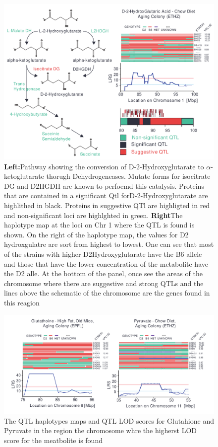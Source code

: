 \documentclass[a4paper,11pt,twoside]{book}
\begin{document}
	\begin{figure}
		\includegraphics[width=1.2\linewidth]{QTL_Results/D2HG_QTL.pdf}
		\caption{\textbf{Left:}Pathway showing the conversion of D-2-Hydroxyglutarate to $\alpha$-ketoglutarate thorugh Dehydrogeneases. Mutate forms for isocitrate DG and D2HGDH are known to perfoemd this catalysis. Proteins that are contained in a significant Qtl forD-2-Hydroxyglutarate are highlithed in black. Proteins in suggestive QTl are highligted in red and non-significant loci are highlghted in green. \textbf{Right}The haplotype map at the loci on Chr 1 where the QTL is found is shown. On the right of the haplotype map, the values for D2 hydroxgulatre are sort from highest to lowest. One can see that most of the strains with higher D2Hydroxyglutarate have the B6 allele and those that have the lower concentration of the metabolite have the D2 alle. At the bottom of the panel, once see the areas of the chromosome where there are suggestive and strong QTLs and the lines above the schematic of the chromosome are the genes found in this reagion}
	\end{figure}
	
	
	\begin{figure}[ht!]
		\centering
		\includegraphics[width=1.2\linewidth]{3.Metabolomics/QTL_Results}
		\caption{ The QTL haplotypes maps and QTL LOD scores for Glutahione and Pyruvate in the region the chromosome whre the higherst LOD score for the meatbolite is found}
		\label{fig:qtlresults}
	\end{figure}
	
\end{document}
